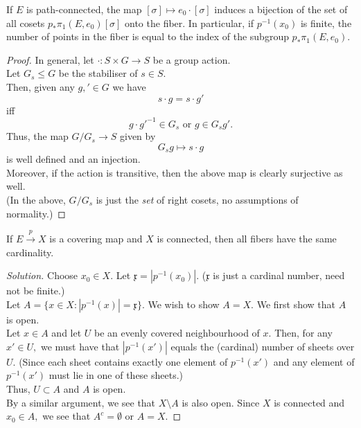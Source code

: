 \documentclass[12pt]{article}
\newenvironment{soln}{\begin{proof}[Solution]}{\end{proof}}
\begin{document}
\begin{cor} \label{cor:indexsubgroupcovering}
	If $E$ is path-connected, the map $[\sigma] \mapsto e_0\cdot[\sigma]$ induces a bijection of the set of all cosets $p_*\pi_1(E, e_0)[\sigma]$ onto the fiber. In particular, if $p^{-1}(x_0)$ is finite, the number of points in the fiber is equal to the index of the subgroup $p_*\pi_1(E, e_0).$
\end{cor}
\begin{proof} 
	In general, let $\cdot:S \times G \to S$ be a group action.\\
	Let $G_s \le G$ be the stabiliser of $s \in S.$\\
	Then, given any $g, ' \in G$ we have
	\begin{equation*} 
		s\cdot g = s\cdot g'
	\end{equation*}
	iff
	\begin{equation*} 
		g\cdot g'^{-1} \in G_s \text{ or } g \in G_sg'.
	\end{equation*}
	Thus, the map $G/G_s \to S$ given by
	\begin{equation*} 
		G_sg \mapsto s\cdot g
	\end{equation*}
	is well defined and an injection.\\
	Moreover, if the action is transitive, then the above map is clearly surjective as well.\\
	(In the above, $G/G_s$ is just the \emph{set} of right cosets, no assumptions of normality.) 
\end{proof}

\begin{exe} \label{ex:fibersamecardinality}
	If $E\overset{p}{\longrightarrow}X$ is a covering map and $X$ is connected, then all fibers have the same cardinality.
\end{exe}
\begin{soln} 
	Choose $x_0 \in X.$ Let $\mathfrak{x} = |p^{-1}(x_0)|.$ ($\mathfrak{x}$ is just a cardinal number, need not be finite.)\\
	Let $A = \{x \in X : |p^{-1}(x)| = \mathfrak{x}\}.$ We wish to show $A = X.$ We first show that $A$ is open.\\
	Let $x \in A$ and let $U$ be an evenly covered neighbourhood of $x.$ Then, for any $x' \in U,$ we must have that $|p^{-1}(x')|$ equals the (cardinal) number of sheets over $U.$ (Since each sheet contains exactly one element of $p^{-1}(x')$ and any element of $p^{-1}(x')$ must lie in one of these sheets.)\\
	Thus, $U \subset A$ and $A$ is open.\\
	By a similar argument, we see that $X\setminus A$ is also open. Since $X$ is connected and $x_0 \in A,$ we see that $A^c = \emptyset$ or $A = X.$
\end{soln}
\end{document}
